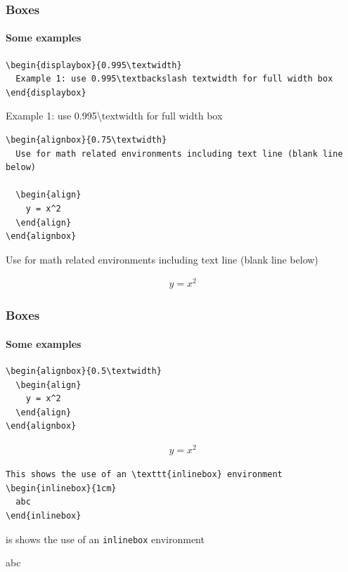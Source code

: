 \documentclass[10pt,t,aspectratio=1610]{beamer}
\begin{document}
\begin{frame}[fragile]
  \frametitle{Boxes}
  \framesubtitle{Some examples}

\begin{verbatim}
\begin{displaybox}{0.995\textwidth}
  Example 1: use 0.995\textbackslash textwidth for full width box  
\end{displaybox}
\end{verbatim}
  
  \begin{displaybox}{0.995\textwidth}
    Example 1: use 0.995\textbackslash textwidth for full width box 
  \end{displaybox}
  
\begin{verbatim}
\begin{alignbox}{0.75\textwidth} 
  Use for math related environments including text line (blank line below)

  \begin{align}
    y = x^2
  \end{align}
\end{alignbox}
\end{verbatim}
  
  \begin{alignbox}{0.75\textwidth}
    Use for math related environments including text line (blank line below)
    
    \begin{align}
      y = x^2
    \end{align}
  \end{alignbox}
\end{frame}


\begin{frame}
  \frametitle{Boxes}
  \framesubtitle{Some examples}
  
\begin{verbatim}
\begin{alignbox}{0.5\textwidth} 
  \begin{align}
    y = x^2
  \end{align}
\end{alignbox}
\end{verbatim}
  
  \begin{alignbox}{0.5\textwidth}
    \begin{align}
      y = x^2
    \end{align}
  \end{alignbox}

\begin{verbatim}
This shows the use of an \texttt{inlinebox} environment
\begin{inlinebox}{1cm}
  abc
\end{inlinebox}
\end{verbatim}\newenvironment{onlinebox}[1]

This shows the use of an \texttt{inlinebox} environment
\begin{inlinebox}{1cm}
  abc
\end{inlinebox}

\end{frame}
\end{document}

